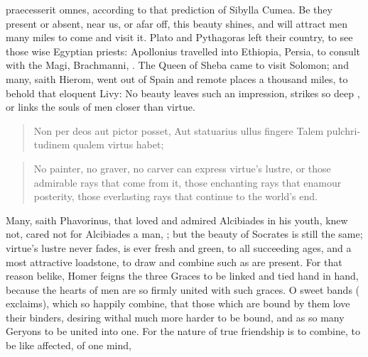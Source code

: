 {{praecesserit omnes}, according to that prediction of Sibylla
Cumea. Be they present or absent, near us, or afar off, this beauty
shines, and will attract men many miles to come and visit it. Plato and
Pythagoras left their country, to see those wise Egyptian priests:
Apollonius travelled into Ethiopia, Persia, to consult with the Magi,
Brachmanni, . The Queen of Sheba came to visit Solomon;
and many, saith Hierom, went out of Spain and remote places a
thousand miles, to behold that eloquent Livy:  No beauty leaves
such an impression, strikes so deep , or links the souls of men
closer than virtue.

\begin{latin}
\begin{verse}%
Non per deos aut pictor posset,
Aut statuarius ullus fingere
Talem pulchritudinem qualem virtus habet;
\end{verse}%
\end{latin}
\translationrule%
\begin{verse}%
No painter, no graver, no carver can express virtue's lustre, or those
admirable rays that come from it, those enchanting rays that enamour
posterity, those everlasting rays that continue to the world's end.
\end{verse}%

Many, saith Phavorinus, that loved and admired Alcibiades in his youth,
knew not, cared not for Alcibiades a man, ; but the beauty of Socrates is still the same;
virtue's lustre never fades, is ever fresh and green, 
to all succeeding ages, and a most attractive loadstone, to draw and
combine such as are present. For that reason belike, Homer feigns the
three Graces to be linked and tied hand in hand, because the hearts of
men are so firmly united with such graces. O sweet bands (\Seneca{}
exclaims), which so happily combine, that those which are bound by them
love their binders, desiring withal much more harder to be bound, and
as so many Geryons to be united into one. For the nature of true
friendship is to combine, to be like affected, of one mind,

}
